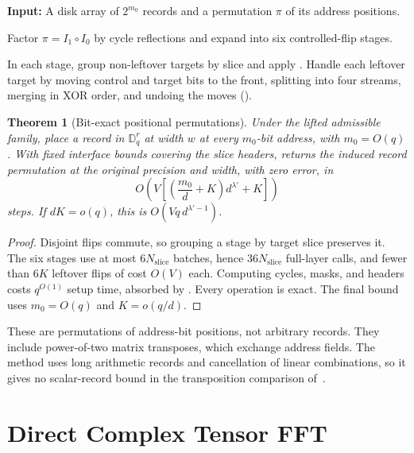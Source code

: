 \documentclass[11pt]{article}
\newtheorem{theorem}{Theorem}[section]
\theoremstyle{definition}
\renewcommand{\label}[1]{}%
\newcommand{\Disk}{\mathbb{D}}
\newcommand{\PositionalPerm}{\textnormal{\textsc{PositionalPerm}}}
\begin{document}
\begin{algorithm}[tb]
\caption{Exact positional permutation $\PositionalPerm(\pi,z)$}\label{alg:pos-perm}
\small
\textbf{Input:} A disk array of $2^{m_0}$ records and a permutation $\pi$ of its address positions.
\begin{algsteps}[itemsep=1pt,topsep=2pt]
\item Factor $\pi=I_1\circ I_0$ by cycle reflections and expand into six
controlled-flip stages.
\item In each stage, group non-leftover targets by slice and apply
. Handle each leftover target by moving control and target
bits to the front, splitting into four streams, merging in XOR order, and
undoing the moves ().
\end{algsteps}
\end{algorithm}

\begin{theorem}[Bit-exact positional permutations]\label{thm:pos-perm}
Under the lifted admissible family, place a record in $\Disk_q^r$ at width $w$
at every $m_0$-bit address, with $m_0=O(q)$.
With fixed interface bounds covering the slice headers,
 returns the induced record permutation at the original
precision and width, with zero error, in
\[
 O\!\left(V\left[\left(\frac{m_0}{d}+K\right)d^{\lambda'}+K\right]\right)
\]
steps. If $dK=o(q)$, this is $O(Vq\,d^{\lambda'-1})$.
\end{theorem}
\begin{proof}
Disjoint flips commute, so grouping a stage by target slice preserves it.
The six stages use at most $6N_{\mathrm{slice}}$ batches, hence
$36N_{\mathrm{slice}}$ full-layer calls, and fewer than $6K$ leftover flips
of cost $O(V)$ each.
Computing cycles, masks, and headers costs $q^{O(1)}$ setup time, absorbed by .
Every operation is exact.
The final bound uses $m_0=O(q)$ and $K=o(q/d)$.
\end{proof}

These are permutations of address-bit positions, not arbitrary records.
They include power-of-two matrix transposes, which exchange address fields.
The method uses long arithmetic records and cancellation of linear combinations, so it gives no scalar-record bound in the transposition comparison of~\cite{HvdH25}.

\section{Direct Complex Tensor FFT}\label{sec:fft}
\end{document}
